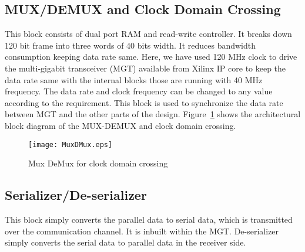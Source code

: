 \documentclass[10pt, conference, compsocconf]{IEEEtran}
\begin{document}
\subsection{MUX/DEMUX and Clock Domain Crossing} 
This block consists of dual port RAM and read-write controller. It breaks down 120 bit frame into three words of 40 bits width. It reduces bandwidth consumption keeping data rate same. Here, we have used 120 MHz clock to drive the multi-gigabit transceiver (MGT) available from Xilinx IP core to keep the data rate same with the internal blocks those are running with 40 MHz frequency. The data rate and clock frequency can be changed to any value according to the requirement. This block is used to synchronize the data rate between MGT and the other parts of the design. Figure~\ref{fig:MuxDMux} shows the architectural block diagram of the MUX-DEMUX and clock domain crossing.
\begin{figure}[htb]
\hspace{-30 pt}
\texttt{[image: MuxDMux.eps]}
\vspace{-14 pt}
\caption{Mux DeMux for clock domain crossing}

\label{fig:MuxDMux}
\end{figure}
\subsection{Serializer/De-serializer} This block simply converts the parallel data to serial data, which is transmitted over the communication channel. It is inbuilt within the MGT.  De-serializer simply converts the serial data to parallel data in the receiver side.
\end{document}
